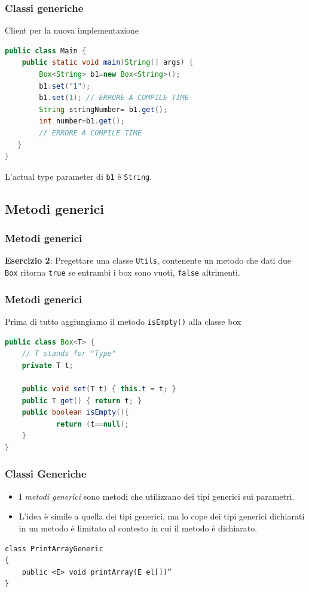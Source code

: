 \documentclass{beamer}
\begin{document}
\begin{frame}[fragile]
\frametitle{Classi generiche}
Client per la nuova implementazione
\begin{framed}
\begin{lstlisting}[language=Java]
public class Main {
    public static void main(String[] args) {
        Box<String> b1=new Box<String>();
        b1.set("1");
        b1.set(1); // ERRORE A COMPILE TIME
        String stringNumber= b1.get();
        int number=b1.get(); 
        // ERRORE A COMPILE TIME
   }
}
\end{lstlisting}
L'actual type parameter di \texttt{b1} \`e \texttt{String}.
\end{framed}
\end{frame}



\subsection{Metodi generici}
\begin{frame}[fragile]
\frametitle{Metodi generici}
\begin{framed}
\textbf{Esercizio 2}: Pregettare una classe \texttt{Utils}, contenente un metodo che dati due \texttt{Box} ritorna \texttt{true} se entrambi i box sono vuoti, \texttt{false} altrimenti.
\end{framed}
\end{frame}

\begin{frame}[fragile]
\frametitle{Metodi generici}
Prima di tutto aggiungiamo il metodo \texttt{isEmpty()} alla classe box
\begin{framed}
\begin{lstlisting}[language=Java]
public class Box<T> {
    // T stands for "Type"
    private T t;

    public void set(T t) { this.t = t; }
    public T get() { return t; }
    public boolean isEmpty(){
    		return (t==null);
    }
}
\end{lstlisting}
\end{framed}
\end{frame}


\begin{frame}[fragile]
\frametitle{Classi Generiche}
\begin{itemize}
\item  I \emph{metodi generici} sono metodi che utilizzano dei tipi generici sui parametri. 
\item L'idea \`e simile a quella dei tipi generici, ma lo cope dei tipi generici dichiarati in un metodo \`e limitato al contesto in cui il metodo \`e dichiarato. 
\end{itemize}
\begin{lstlisting}
class PrintArrayGeneric
{
    public <E> void printArray(E el[])”
}
\end{lstlisting}
\end{frame}
\end{document}
